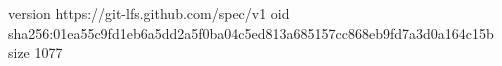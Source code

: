 version https://git-lfs.github.com/spec/v1
oid sha256:01ea55c9fd1eb6a5dd2a5f0ba04c5ed813a685157cc868eb9fd7a3d0a164c15b
size 1077
